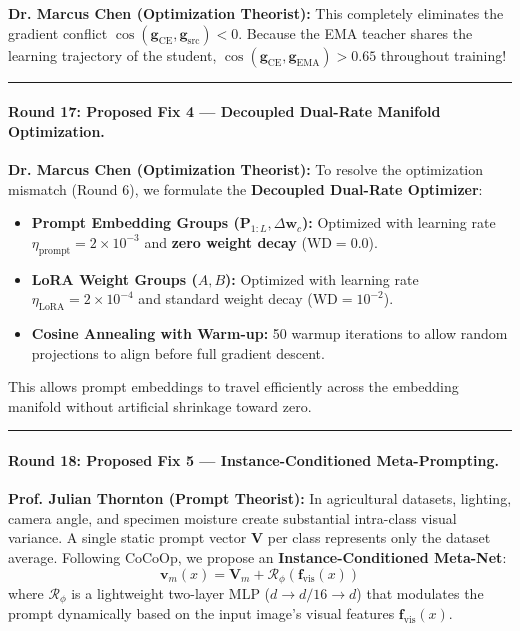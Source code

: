 \documentclass[letterpaper,11pt,leqno]{article}
\newcommand{\speakerThornton}[1]{\noindent\textbf{\color{blue!70!black}Prof. Julian Thornton (Prompt Theorist):} #1\vspace{0.4em}}
\newcommand{\speakerChen}[1]{\noindent\textbf{\color{green!60!black}Dr. Marcus Chen (Optimization Theorist):} #1\vspace{0.4em}}
\begin{document}
\speakerChen{This completely eliminates the gradient conflict $\cos(\mathbf{g}_\mathrm{CE}, \mathbf{g}_\mathrm{src}) < 0$. Because the EMA teacher shares the learning trajectory of the student, $\cos(\mathbf{g}_\mathrm{CE}, \mathbf{g}_\mathrm{EMA}) > 0.65$ throughout training!}

\vspace{0.8em}\hrule\vspace{0.8em}

\paragraph{Round 17: Proposed Fix 4 — Decoupled Dual-Rate Manifold Optimization.}
\speakerChen{To resolve the optimization mismatch (Round 6), we formulate the \textbf{Decoupled Dual-Rate Optimizer}:
\begin{itemize}
    \item \textbf{Prompt Embedding Groups ($\mathbf{P}_{1:L}, \Delta \mathbf{w}_c$):} Optimized with learning rate $\eta_\mathrm{prompt} = 2 \times 10^{-3}$ and \textbf{zero weight decay} ($\mathrm{WD} = 0.0$).
    \item \textbf{LoRA Weight Groups ($A, B$):} Optimized with learning rate $\eta_\mathrm{LoRA} = 2 \times 10^{-4}$ and standard weight decay ($\mathrm{WD} = 10^{-2}$).
    \item \textbf{Cosine Annealing with Warm-up:} 50 warmup iterations to allow random projections to align before full gradient descent.
\end{itemize}
This allows prompt embeddings to travel efficiently across the embedding manifold without artificial shrinkage toward zero.}

\vspace{0.8em}\hrule\vspace{0.8em}

\paragraph{Round 18: Proposed Fix 5 — Instance-Conditioned Meta-Prompting.}
\speakerThornton{In agricultural datasets, lighting, camera angle, and specimen moisture create substantial intra-class visual variance. A single static prompt vector $\mathbf{V}$ per class represents only the dataset average. Following CoCoOp, we propose an \textbf{Instance-Conditioned Meta-Net}:
\begin{equation}
    \mathbf{v}_m(x) = \mathbf{V}_m + \mathcal{R}_\phi(\mathbf{f}_\mathrm{vis}(x))
\end{equation}
where $\mathcal{R}_\phi$ is a lightweight two-layer MLP ($d \to d/16 \to d$) that modulates the prompt dynamically based on the input image's visual features $\mathbf{f}_\mathrm{vis}(x)$.}
\end{document}
